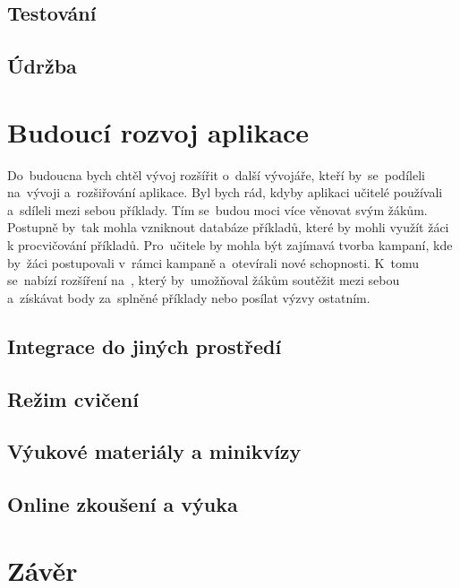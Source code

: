 \documentclass[14pt,a4paper]{article}
\begin{document}
        \subsection{Testování}
        \subsection{Údržba}
        
	\section{Budoucí rozvoj aplikace}
        Do~budoucna bych chtěl vývoj rozšířit o~další vývojáře, kteří by~se~podíleli na~vývoji a~rozšiřování aplikace.
        Byl bych rád, kdyby aplikaci učitelé používali a~sdíleli mezi sebou příklady. Tím se~budou moci více věnovat svým žákům.
        Postupně by~tak mohla vzniknout databáze příkladů, které by mohli využít žáci k procvičování příkladů. Pro~učitele by mohla být zajímavá tvorba kampaní, kde by~žáci postupovali v~rámci kampaně a~otevírali nové schopnosti.
        K~tomu se~nabízí rozšíření na~, který by~umožňoval žákům soutěžit mezi sebou a~získávat body za~splněné příklady nebo posílat výzvy ostatním.

        \subsection{Integrace do jiných prostředí}
        \subsection{Režim cvičení}
        \subsection{Výukové materiály a minikvízy}
        \subsection{Online zkoušení a výuka}
	
	\section{Závěr}

\newpage
\printbibliography
\end{document}
